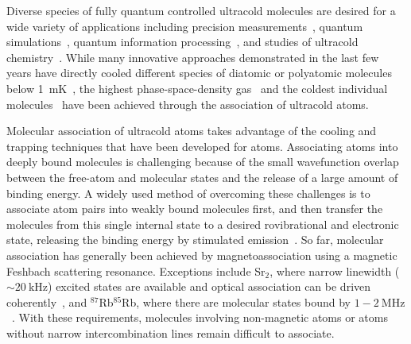 \documentclass[aps,prl,twocolumn,10pt,superscriptaddress]{revtex4-1}
\begin{document}
Diverse species of fully quantum controlled  ultracold molecules are desired
for a wide variety of applications including precision measurements~\cite{
  Kondov2019,Nick_and_Ivan2017, PhysRevA.101.042504, Andreev2018,
  PhysRevLett.119.153001, hudson2011},
quantum simulations~\cite{Micheli2006, Yao2018, Wall2015, wall2015realizing},
quantum information processing~\cite{DeMille2002, Ni2018, Hudson2018, Lin2019},
and studies of ultracold chemistry~\cite{Bala2016,Hu1111,Segev2019,deJongh626}.
While many innovative approaches demonstrated in the last few years
have directly cooled different species of diatomic or polyatomic molecules
below 1~mK~\cite{Norrgard2016,Anderegg2018, Mitra1366, PhysRevX.10.021049,
  PhysRevLett.121.013202, Truppe2017},
the highest phase-space-density gas~\cite{Demarco2018} and
the coldest individual molecules~\cite{Zhang2020,He331}
have been achieved through the association of ultracold atoms.

Molecular association of ultracold atoms takes advantage of the cooling and trapping techniques
that have been developed for atoms.
Associating atoms into deeply bound molecules is challenging
because of the small wavefunction overlap between the free-atom and molecular states
and the release of a large amount of binding energy.
A widely used method of overcoming these challenges is to associate atom pairs
into weakly bound molecules first,
and then transfer the molecules from this single internal state
to a desired rovibrational and electronic state,
releasing the binding energy by stimulated emission~\cite{Danzl2008, Ni2008, Lang2008,
  Takekoshi2014, Molony2014, Park2015, Guo2016, Kondov2019, Voges2020}.
So far, molecular association has generally been achieved by magnetoassociation using a magnetic Feshbach scattering resonance.
Exceptions include Sr$_2$, where narrow linewidth ($\sim 20~\mathrm{kHz}$) excited states
are available and optical association can be driven coherently~\cite{Reinaudi2012,Stellmer2012},
and $^{87}$Rb$^{85}$Rb,
where there are molecular states bound by $1-2~\mathrm{MHz}$~\cite{He331}.
With these requirements, molecules involving non-magnetic atoms
or atoms without narrow intercombination lines remain difficult to associate.
\end{document}

